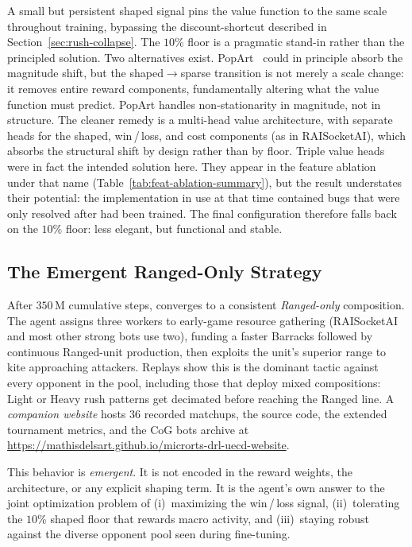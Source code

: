 A small but persistent shaped signal pins the value function to the same scale throughout training, bypassing the discount-shortcut described in Section~\ref{sec:rush-collapse}. The $10$\% floor is a pragmatic stand-in rather than the principled solution. Two alternatives exist. PopArt~\cite{vanhasseltLearningValuesMany2016} could in principle absorb the magnitude shift, but the shaped$\to$sparse transition is not merely a scale change: it removes entire reward components, fundamentally altering what the value function must predict. PopArt handles non-stationarity in magnitude, not in structure. The cleaner remedy is a multi-head value architecture, with separate heads for the shaped, win\,/\,loss, and cost components (as in RAISocketAI), which absorbs the structural shift by design rather than by floor. Triple value heads were in fact the intended solution here. They appear in the feature ablation under that name (Table~\ref{tab:feat-ablation-summary}), but the result understates their potential: the implementation in use at that time contained bugs that were only resolved after  had been trained. The final configuration therefore falls back on the $10$\% floor: less elegant, but functional and stable.

\subsection{The Emergent Ranged-Only Strategy}
\label{sec:emergent-strategy}

After $350\,\text{M}$ cumulative steps,  converges to a consistent \textit{Ranged-only} composition. The agent assigns three workers to early-game resource gathering (RAISocketAI and most other strong bots use two), funding a faster Barracks followed by continuous Ranged-unit production, then exploits the unit's superior range to kite approaching attackers. Replays show this is the dominant tactic against every opponent in the pool, including those that deploy mixed compositions: Light or Heavy rush patterns get decimated before reaching the Ranged line. A \emph{companion website} hosts $36$ recorded  matchups, the source code, the extended tournament metrics, and the CoG bots archive at \url{https://mathisdelsart.github.io/microrts-drl-uecd-website}.

This behavior is \emph{emergent}. It is not encoded in the reward weights, the architecture, or any explicit shaping term. It is the agent's own answer to the joint optimization problem of (i)~maximizing the win\,/\,loss signal, (ii)~tolerating the $10$\% shaped floor that rewards macro activity, and (iii)~staying robust against the diverse opponent pool seen during fine-tuning.

